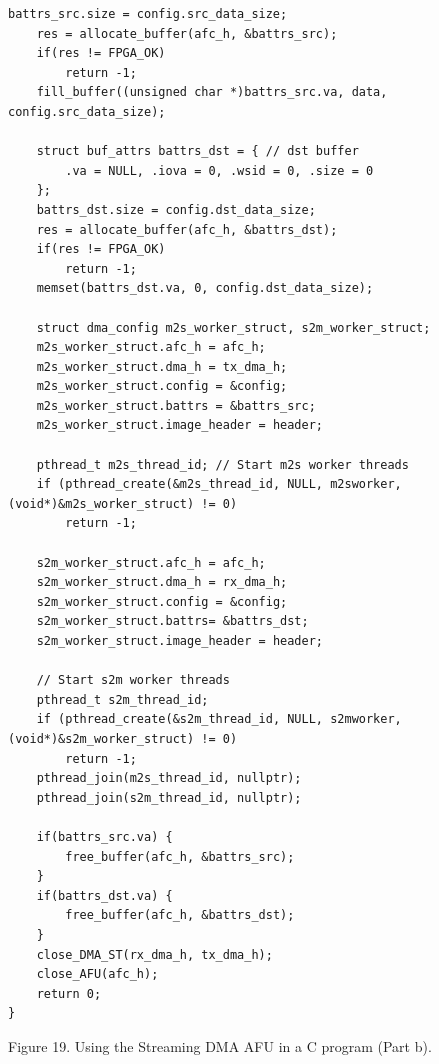 \documentclass[11pt, twoside, pdftex]{article}
\begin{document}
 \lstset{language=C,numbers=left,escapechar=\#}
\begin{minipage}[h]{17.5 cm}
\begin{lstlisting}[name=stdma_C_code]
	battrs_src.size = config.src_data_size;
	res = allocate_buffer(afc_h, &battrs_src);
	if(res != FPGA_OK)
		return -1;
	fill_buffer((unsigned char *)battrs_src.va, data, config.src_data_size);

	struct buf_attrs battrs_dst = { // dst buffer
		.va = NULL, .iova = 0, .wsid = 0, .size = 0
	};
	battrs_dst.size = config.dst_data_size;
	res = allocate_buffer(afc_h, &battrs_dst);
	if(res != FPGA_OK)
		return -1;
	memset(battrs_dst.va, 0, config.dst_data_size);
	
	struct dma_config m2s_worker_struct, s2m_worker_struct;
	m2s_worker_struct.afc_h = afc_h;
	m2s_worker_struct.dma_h = tx_dma_h;
	m2s_worker_struct.config = &config;
	m2s_worker_struct.battrs = &battrs_src;
	m2s_worker_struct.image_header = header;

	pthread_t m2s_thread_id; // Start m2s worker threads
	if (pthread_create(&m2s_thread_id, NULL, m2sworker, (void*)&m2s_worker_struct) != 0) 
		return -1;

	s2m_worker_struct.afc_h = afc_h;
	s2m_worker_struct.dma_h = rx_dma_h;
	s2m_worker_struct.config = &config;
	s2m_worker_struct.battrs= &battrs_dst;
	s2m_worker_struct.image_header = header;
		
	// Start s2m worker threads
	pthread_t s2m_thread_id;
	if (pthread_create(&s2m_thread_id, NULL, s2mworker, (void*)&s2m_worker_struct) != 0) 
		return -1;
	pthread_join(m2s_thread_id, nullptr);
	pthread_join(s2m_thread_id, nullptr);

	if(battrs_src.va) {
		free_buffer(afc_h, &battrs_src);
	}
	if(battrs_dst.va) {
		free_buffer(afc_h, &battrs_dst);
	}
	close_DMA_ST(rx_dma_h, tx_dma_h);
	close_AFU(afc_h);
	return 0;
}
\end{lstlisting}
\begin{center}
   Figure 19. Using the Streaming DMA AFU in a C program (Part b).
\end{center}
\end{minipage}
\end{document}
